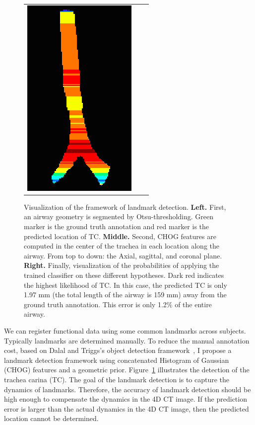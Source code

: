 \begin{figure}[tb]
\begin{center}
\begin{tabular}{ccc}
    \includegraphics[height=\figheight] {fig/Fleck_005_likelihood.png}
    \end{tabular}
    \caption{ \label{fig:detection} Visualization of the framework of landmark detection. {\bf Left.} First, an airway geometry is segmented by Otsu-thresholding. Green marker is the ground truth annotation and red marker is the predicted location of TC. {\bf Middle.} Second, CHOG features are computed in the center of the trachea in each location along the airway. From top to down: the Axial, sagittal, and coronal plane. {\bf Right.} Finally, visualization of the probabilities of applying the trained classifier on these different hypotheses. Dark red indicates the highest likelihood of TC. In this case, the predicted TC is only 1.97 mm (the total length of the airway is 159 mm) away from the ground truth annotation. This error is only 1.2$\%$ of the entire airway.
    }
  \end{center}
\end{figure}

We can register functional data using some common landmarks across subjects.
Typically landmarks are determined manually.
To reduce the manual annotation cost, based on Dalal and Triggs's object detection framework~\cite{dalal2005histograms}, I propose a landmark detection framework using concatenated Histogram of Gaussian (CHOG) features and a geometric prior. 
Figure~\ref{fig:detection} illustrates the detection of the trachea carina (TC).
The goal of the landmark detection is to capture the dynamics of landmarks.
Therefore, the accuracy of landmark detection should be high enough to compensate the dynamics in the 4D CT image.
If the prediction error is larger than the actual dynamics in the 4D CT image, then the predicted location cannot be determined.

